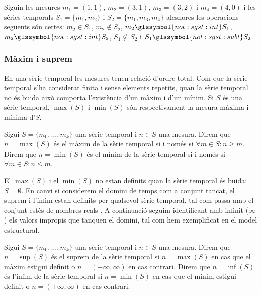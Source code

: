 \begin{example}
  Siguin les mesures $m_1=(1,1)$, $m_2=(3,1)$, $m_3=(3,2)$ i
  $m_4=(4,0)$ i les sèries temporals $S_1=\{m_1,m_2\}$ i
  $S_2=\{m_1,m_3,m_4\}$ aleshores les operacions següents són certes:
  $m_2 \in S_1$, $m_2 \notin S_2$, $m_2 \glssymbol{not:sgst:int} S_1$,
  $m_2 \glssymbol{not:sgst:int} S_2$, $S_1\not\subseteq S_2$ i
  $S_1\glssymbol{not:sgst:subt} S_2$.
\end{example}

\subsubsection{Màxim i suprem}


En una sèrie temporal les mesures tenen relació d'ordre total. Com que
la sèrie temporal s'ha considerat finita i sense elements repetits,
quan la sèrie temporal no és buida això comporta l'existència d'un
màxim i d'un mínim.  Si $S$ és una sèrie temporal, $\max(S)$ i
$\min(S)$ són respectivament la mesura màxima i mínima d'$S$.

\begin{definition}
  Sigui $S=\{m_0,\ldots,m_k\}$ una sèrie temporal i $n\in S$ una
  mesura.  Direm que $n=\max(S)$ és el màxim de la sèrie temporal si i
  només si $\forall m \in S: n \geq m $.  Direm que $n=\min(S)$ és el
  mínim de la sèrie temporal si i només si $\forall m \in S: n \leq
  m$.
\end{definition}

El $\max(S)$ i el $\min(S)$ no estan definits quan la sèrie temporal
és buida: $S= \emptyset$. En canvi si considerem el domini de temps
com a conjunt tancat, el suprem i l'ínfim estan definits per qualsevol
sèrie temporal, tal com passa amb el conjunt estès de nombres reals
\cite{cantrell:extendedreal}. A continuació seguim identificant amb
infinit ($\infty$) els valors impropis que tanquen el domini, tal com
hem exemplificat en el model estructural.
\begin{definition}\label{def:sgst:sup}\label{def:sgst:inf}
  Sigui $S=\{m_0,\ldots,m_k\}$ una sèrie temporal i $n\in S$ una
  mesura.  Direm que $n=\sup(S)$ és el suprem de la sèrie temporal si
  $n=\max(S)$ en cas que el màxim estigui definit o
  $n=(-\infty,\infty)$ en cas contrari.  Direm que $n=\inf(S)$ és
  l'ínfim de la sèrie temporal si $n=\min(S)$ en cas que el mínim
  estigui definit o $n=(+\infty,\infty)$ en cas contrari.
\end{definition}

